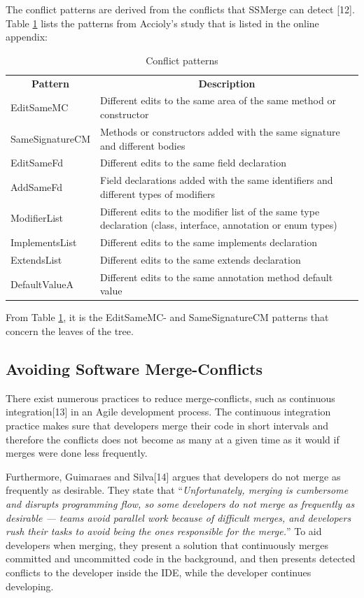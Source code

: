 The conflict patterns are derived from the conflicts that SSMerge can detect [12]. Table \ref{table:conflictpatterns} lists the patterns from Accioly’s study that is listed in the online appendix:\\%
\begin{table}
\caption{Conflict patterns}\label{table:conflictpatterns}
\begin{tabular}{| l | p{10cm} |}
\hline
\multicolumn{1}{c}{\textbf{Pattern}} & \multicolumn{1}{c}{\textbf{Description}}\\
EditSameMC & Different edits to the same area of the same method or constructor\\
SameSignatureCM & Methods or constructors added with the same signature and different bodies\\
EditSameFd & Different edits to the same field declaration\\
AddSameFd & Field declarations added with the same identifiers and different types of modifiers\\
ModifierList & Different edits to the modifier list of the same type declaration (class, interface, annotation or enum types)\\
ImplementsList & Different edits to the same implements declaration\\
ExtendsList & Different edits to the same extends declaration\\
DefaultValueA & Different edits to the same annotation method default value
\end{tabular}
\end{table}
From Table \ref{table:conflictpatterns}, it is the EditSameMC- and SameSignatureCM patterns that concern the leaves of the tree.

\subsection{Avoiding Software Merge-Conflicts}
There exist numerous practices to reduce merge-conflicts, such as continuous integration[13] in an Agile development process. The continuous integration practice makes sure that developers merge their code in short intervals and therefore the conflicts does not become as many at a given time as it would if merges were done less frequently.

Furthermore, Guimaraes and Silva[14] argues that developers do not merge as frequently as desirable. They state that “\textit{Unfortunately, merging is cumbersome and disrupts programming flow, so some developers do not merge as frequently as desirable — teams avoid parallel work because of difficult merges, and developers rush their tasks to avoid being the ones responsible for the merge.}” To aid developers when merging, they present a solution that continuously merges committed and uncommitted code in the background, and then presents detected conflicts to the developer inside the IDE, while the developer continues developing.

